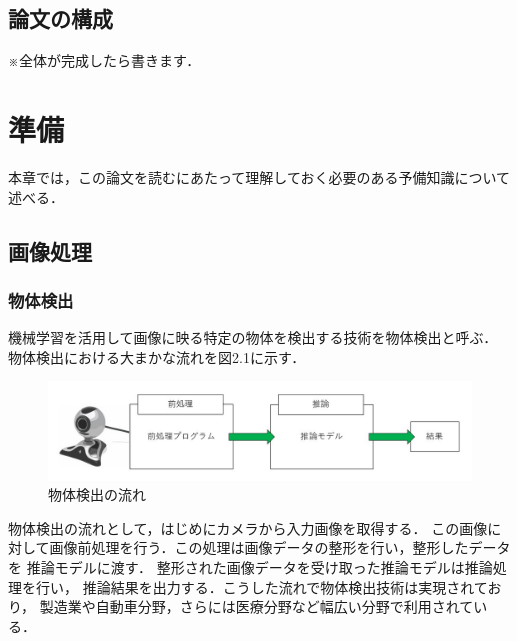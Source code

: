 \documentclass[11pt,a4j]{jreport}
\begin{document}
\section{論文の構成}
※全体が完成したら書きます．
%
\chapter{準備}
本章では，この論文を読むにあたって理解しておく必要のある予備知識について述べる．
\section{画像処理}
\subsection{物体検出}
機械学習を活用して画像に映る特定の物体を検出する技術を物体検出と呼ぶ．
物体検出における大まかな流れを図2.1に示す．
\begin{figure}[H]
  \center
  \includegraphics[scale = 0.8]{pict/pict4.jpg}
  \caption{物体検出の流れ}
\end{figure}
物体検出の流れとして，はじめにカメラから入力画像を取得する．
この画像に対して画像前処理を行う．この処理は画像データの整形を行い，整形したデータを
推論モデルに渡す．
整形された画像データを受け取った推論モデルは推論処理を行い，
推論結果を出力する．こうした流れで物体検出技術は実現されており，
製造業や自動車分野，さらには医療分野など幅広い分野で利用されている．
\end{document}
